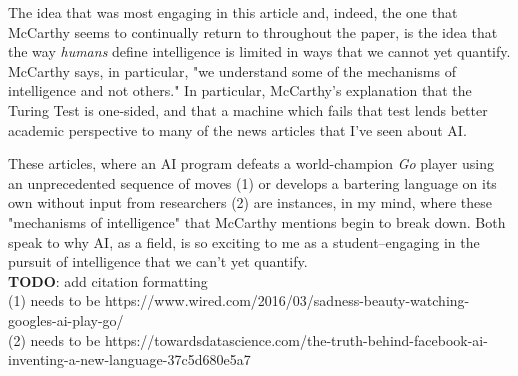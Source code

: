 \documentclass{article}
\begin{document}
  
  \graphicspath{{./images/}}
\par The idea that was most engaging in this article and, indeed, the one that McCarthy seems to continually return to throughout the paper, is the idea that the way \textit{humans} define intelligence is limited in ways that we cannot yet quantify. 
McCarthy says, in particular, "we understand some of the mechanisms of intelligence and not others." 
In particular, McCarthy's explanation that the Turing Test is one-sided, and that a machine which fails that test lends better academic perspective to many of the news articles that I've seen about AI. 
\par These articles, where an AI program defeats a world-champion \textit{Go} player using an unprecedented sequence of moves (1) 
or develops a bartering language on its own without input from researchers (2) are instances, in my mind, where these "mechanisms of intelligence" that McCarthy mentions begin to break down. 
Both speak to why AI, as a field, is so exciting to me as a student--engaging in the pursuit of intelligence that we can't yet quantify.
\\[0.5in]
\textbf{TODO}: add citation formatting
\\
(1) needs to be https://www.wired.com/2016/03/sadness-beauty-watching-googles-ai-play-go/
\\
(2) needs to be https://towardsdatascience.com/the-truth-behind-facebook-ai-inventing-a-new-language-37c5d680e5a7
\end{document}
